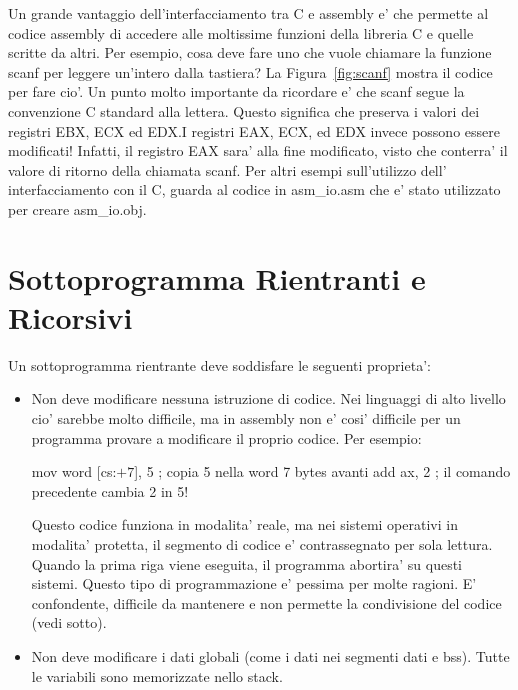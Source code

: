 Un grande vantaggio dell'interfacciamento tra C e assembly e' che
permette al codice assembly di accedere alle moltissime funzioni
della libreria C e quelle scritte da altri. Per esempio, cosa deve
fare uno che vuole chiamare la funzione {\code scanf} per leggere
un'intero dalla tastiera? La Figura~\ref{fig:scanf} mostra il codice
per fare cio'. Un punto molto importante da ricordare e' che {\code scanf}
segue la convenzione C standard alla lettera. Questo significa che
preserva i valori dei registri EBX, ECX ed EDX.I registri EAX, ECX, 
ed EDX invece possono essere modificati! Infatti, il registro EAX
sara' alla fine modificato, visto che conterra' il valore di ritorno
della chiamata {\code scanf}. Per altri esempi sull'utilizzo dell'
interfacciamento con il C, guarda al codice in {\code asm\_io.asm}
che e' stato utilizzato per creare {\code asm\_io.obj}.  

\section{Sottoprogramma Rientranti e Ricorsivi}

Un sottoprogramma rientrante deve soddisfare le seguenti proprieta':
\begin{itemize}
\item Non deve modificare nessuna istruzione di codice. Nei linguaggi di 
alto livello cio' sarebbe molto difficile, ma in assembly non e' cosi' difficile
per un programma provare a modificare il proprio codice. Per esempio:
\begin{AsmCodeListing}[frame=none, numbers=none]
      mov    word [cs:$+7$], 5      ; copia 5 nella word 7 bytes avanti
      add    ax, 2                 ; il comando precedente cambia 2 in 5!
\end{AsmCodeListing}
Questo codice funziona in modalita' reale, ma nei sistemi operativi in modalita'
protetta, il segmento di codice e' contrassegnato per sola lettura. Quando la
prima riga viene eseguita, il programma abortira' su questi sistemi. Questo
tipo di programmazione e' pessima per molte ragioni. E' confondente, difficile da
mantenere e non permette la condivisione del codice (vedi sotto).

\item Non deve modificare i dati globali (come i dati nei segmenti {\code dati} 
e {\code bss}). Tutte le variabili sono memorizzate nello stack.

\end{itemize}

